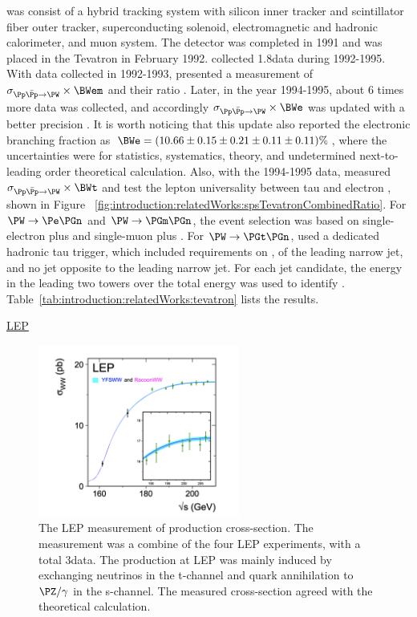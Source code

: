\DZERO was consist of a hybrid tracking system with silicon inner tracker and scintillator fiber outer tracker, superconducting solenoid, electromagnetic and hadronic calorimeter, and muon system. The detector was completed in 1991 and was placed in the Tevatron in February 1992.  \DZERO collected 1.8\TeV data during 1992-1995. With data collected in 1992-1993,  \DZERO presented a measurement of $\sigma_{\Pp\bar{\Pp}\to \PW} \times \BWem$ and their ratio \cite{Abachi:1995xc}. Later, in the year 1994-1995, about 6 times more data was collected, and accordingly $\sigma_{\Pp\bar{\Pp}\to \PW} \times \BWe$ was updated with a better precision \cite{Abbott:1999tt}. It is worth noticing that this update \cite{Abbott:1999tt} also reported the electronic branching fraction as $\BWe=(10.66\pm0.15\pm0.21\pm0.11\pm0.11)\%$, where the uncertainties were for statistics, systematics, theory, and undetermined next-to-leading order theoretical calculation. Also, with the 1994-1995 data,  \DZERO measured $\sigma_{\Pp\bar{\Pp}\to \PW} \times \BWt$ and test the lepton universality between tau and electron \cite{Abbott:1999pk}, shown in Figure ~\ref{fig:introduction:relatedWorks:spsTevatronCombinedRatio}. For $\PW \to \Pe \PGn$ and $\PW \to \PGm \PGn$, the event selection was based on single-electron plus \MET and single-muon plus \MET. For $\PW \to \PGt \PGn$,  \DZERO used a dedicated hadronic tau trigger, which included requirements on \MET, \pt of the leading narrow jet, and no jet opposite to the leading narrow jet. For each jet candidate, the energy in the leading two towers over the total energy was used to identify \PGth. Table~\ref{tab:introduction:relatedWorks:tevatron} lists the  \DZERO results.




\underline{LEP}

\begin{figure}[ht]
    \centering
    \includegraphics[width=0.59\textwidth]{chapters/Introduction/sectionRelatedWorks/figures/lepCrosssection.png}
    \caption{The LEP measurement of \WW production cross-section. The measurement was a combine of the four LEP experiments, with a total 3\fbinv  data. The \WW production at LEP was mainly induced by exchanging neutrinos in the t-channel and quark annihilation to $\PZ/\gamma$  in the s-channel. The measured cross-section agreed with the theoretical calculation.}
    \label{fig:introduction:relatedWorks:lepCrosssection}
\end{figure}


